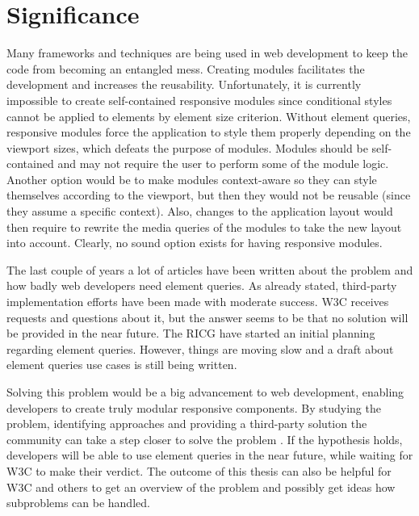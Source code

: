 \documentclass[a4paper,11pt]{kth-mag}
\begin{document}
    \section{Significance}
      Many frameworks and techniques are being used in \gls{web} development to keep the code from becoming an entangled mess.
      Creating modules facilitates the development and increases the reusability.
      Unfortunately, it is currently impossible to create \gls{self-contained} \gls{responsive} modules since conditional styles cannot be applied to \glspl{element} by \gls{element} size criterion.
      Without element queries, \gls{responsive} modules force the application to style them properly depending on the \gls{viewport} sizes, which defeats the purpose of modules.
      Modules should be \gls{self-contained} and may not require the user to perform some of the module logic.
      Another option would be to make modules context-aware so they can style themselves according to the \gls{viewport}, but then they would not be reusable (since they assume a specific context).
      Also, changes to the application layout would then require to rewrite the \gls{media queries} of the modules to take the new layout into account.
      Clearly, no sound option exists for having \gls{responsive} modules.

      The last couple of years a lot of articles have been written about the problem and how badly \gls{web} developers need element queries.
      As already stated, \gls{third-party} implementation efforts have been made with moderate success.
      \gls{W3C} receives requests and questions about it, but the answer seems to be that no solution will be provided in the near future.
      The \gls{RICG} have started an initial planning regarding element queries.
      However, things are moving slow and a draft about element queries use cases is still being written.

      Solving this problem would be a big advancement to \gls{web} development, enabling developers to create truly modular \gls{responsive} components.
      By studying the problem, identifying approaches and providing a \gls{third-party} solution the community can take a step closer to solve the problem .
      If the hypothesis holds, developers will be able to use element queries in the near future, while waiting for \gls{W3C} to make their verdict.
      The outcome of this thesis can also be helpful for \gls{W3C} and others to get an overview of the problem and possibly get ideas how subproblems can be handled.
\end{document}
